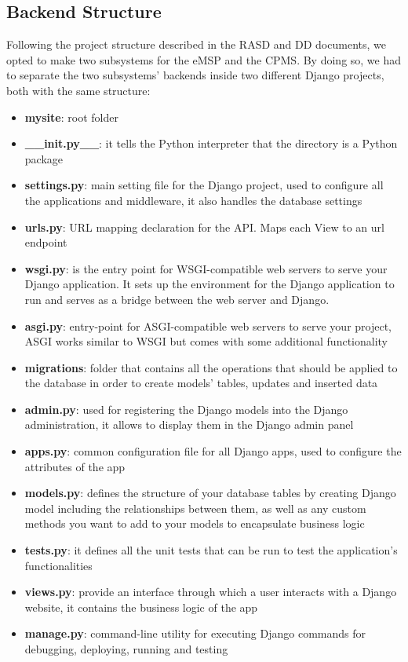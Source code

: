 \documentclass[table, 12pt]{article}
\begin{document}
\subsection{Backend Structure}
Following the project structure described in the RASD and DD documents, we opted to make two subsystems for the eMSP and the CPMS.
By doing so, we had to separate the two subsystems' backends inside two different Django projects, both with the same structure:
\begin{itemize}
    \item \textbf{mysite}: root folder
    \item \textbf{\_\_init.py\_\_}: it tells the Python interpreter that the directory is a Python package
    \item \textbf{settings.py}: main setting file for the Django project, used to configure all the applications and middleware, it also handles the database settings
    \item \textbf{urls.py}: URL mapping declaration for the API. Maps each View to an url endpoint
    \item \textbf{wsgi.py}: is the entry point for WSGI-compatible web servers to serve your Django application. It sets up the environment for the Django application to run and serves as a bridge between the web server and Django.
    \item \textbf{asgi.py}: entry-point for ASGI-compatible web servers to serve your project, ASGI works similar to WSGI but comes with some additional functionality
    \item \textbf{migrations}: folder that contains all the operations that should be applied to the database in order to create models' tables, updates and inserted data
    \item \textbf{admin.py}: used for registering the Django models into the Django administration, it allows to display them in the Django admin panel
    \item \textbf{apps.py}: common configuration file for all Django apps, used to configure the attributes of the app
    \item \textbf{models.py}: defines the structure of your database tables by creating Django model including the relationships between them, as well as any custom methods you want to add to your models to encapsulate business logic
    \item \textbf{tests.py}: it defines all the unit tests that can be run to test the application's functionalities
    \item \textbf{views.py}: provide an interface through which a user interacts with a Django website, it contains the business logic of the app
    \item \textbf{manage.py}: command-line utility for executing Django commands for debugging, deploying, running and testing
\end{itemize}
\end{document}
